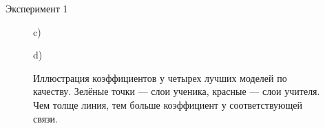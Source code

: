 \documentclass{beamer}
\begin{document}
\begin{frame}{Эксперимент 1}
\begin{figure}[H]
\begin{minipage}[h]{0.35\linewidth}
             c) \\
        \end{minipage}
        \hfill
        \begin{minipage}[h]{0.35\linewidth}
             d) \\
        \end{minipage}
        \caption{Иллюстрация коэффициентов у четырех лучших моделей по качеству. Зелёные точки --- слои ученика, красные --- слои учителя. Чем толще линия, тем больше коэффициент у соответствующей связи.}
    \end{figure}
\end{frame}

\end{document}
